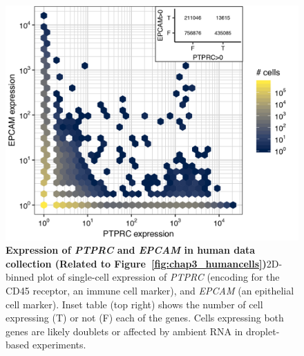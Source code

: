 \begin{figure}[pht!] 
\centering    
\includegraphics[scale=0.81]{Appendix2/Figs/PTPRC_EPCAM_human.png} %
\caption[Expression of \textit{PTPRC} and \textit{EPCAM} in human data collection]{\textbf{Expression of \textit{PTPRC} and \textit{EPCAM} in human data collection (Related to Figure~\ref{fig:chap3_humancells})}\newline2D-binned plot of single-cell expression of \textit{PTPRC} (encoding for the CD45 receptor, an immune cell marker), and \textit{EPCAM} (an epithelial cell marker). Inset table (top right) shows the number of cell expressing (T) or not (F) each of the genes. Cells expressing both genes are likely doublets or affected by ambient RNA in droplet-based experiments.}
\label{fig:appB_ptprc}
\end{figure}


